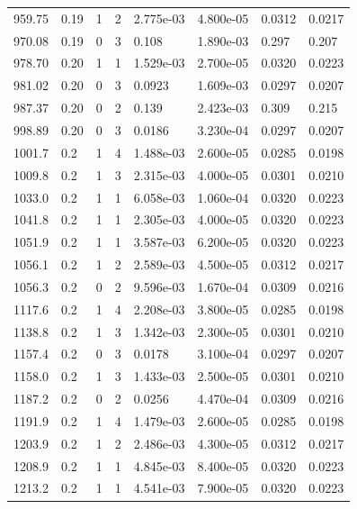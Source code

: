 \documentclass[preview]{standalone}
\begin{document}
{{{\begin{tabular}{L{1.2cm}C{1.2cm} C{0.3cm}C{0.5cm} C{1.4cm}C{1.4cm} C{1.4cm}C{1.4cm}}
  959.75  &  0.19  & 1     &  2 &  2.775e-03  & 4.800e-05  & 0.0312 &  0.0217   \\ 
  970.08  &  0.19  & 0     &  3 &  0.108  & 1.890e-03  & 0.297 &  0.207   \\ 
  978.70  &  0.20  & 1     &  1 &  1.529e-03  & 2.700e-05  & 0.0320 &  0.0223   \\ 
  981.02  &  0.20  & 0     &  3 &  0.0923  & 1.609e-03  & 0.0297 &  0.0207   \\ 
  987.37  &  0.20  & 0     &  2 &  0.139  & 2.423e-03  & 0.309 &  0.215   \\ 
  998.89  &  0.20  & 0     &  3 &  0.0186  & 3.230e-04  & 0.0297 &  0.0207   \\ 
  1001.7  &   0.2  & 1     &  4 &  1.488e-03  & 2.600e-05  & 0.0285 &  0.0198   \\ 
  1009.8  &   0.2  & 1     &  3 &  2.315e-03  & 4.000e-05  & 0.0301 &  0.0210   \\ 
  1033.0  &   0.2  & 1     &  1 &  6.058e-03  & 1.060e-04  & 0.0320 &  0.0223   \\ 
  1041.8  &   0.2  & 1     &  1 &  2.305e-03  & 4.000e-05  & 0.0320 &  0.0223   \\ 
  1051.9  &   0.2  & 1     &  1 &  3.587e-03  & 6.200e-05  & 0.0320 &  0.0223   \\ 
  1056.1  &   0.2  & 1     &  2 &  2.589e-03  & 4.500e-05  & 0.0312 &  0.0217   \\ 
  1056.3  &   0.2  & 0     &  2 &  9.596e-03  & 1.670e-04  & 0.0309 &  0.0216   \\ 
  1117.6  &   0.2  & 1     &  4 &  2.208e-03  & 3.800e-05  & 0.0285 &  0.0198   \\ 
  1138.8  &   0.2  & 1     &  3 &  1.342e-03  & 2.300e-05  & 0.0301 &  0.0210   \\ 
  1157.4  &   0.2  & 0     &  3 &  0.0178  & 3.100e-04  & 0.0297 &  0.0207   \\ 
  1158.0  &   0.2  & 1     &  3 &  1.433e-03  & 2.500e-05  & 0.0301 &  0.0210   \\ 
  1187.2  &   0.2  & 0     &  2 &  0.0256  & 4.470e-04  & 0.0309 &  0.0216   \\ 
  1191.9  &   0.2  & 1     &  4 &  1.479e-03  & 2.600e-05  & 0.0285 &  0.0198   \\ 
  1203.9  &   0.2  & 1     &  2 &  2.486e-03  & 4.300e-05  & 0.0312 &  0.0217   \\ 
  1208.9  &   0.2  & 1     &  1 &  4.845e-03  & 8.400e-05  & 0.0320 &  0.0223   \\ 
  1213.2  &   0.2  & 1     &  1 &  4.541e-03  & 7.900e-05  & 0.0320 &  0.0223   \\ 

\end{tabular}}}}
\end{document}
